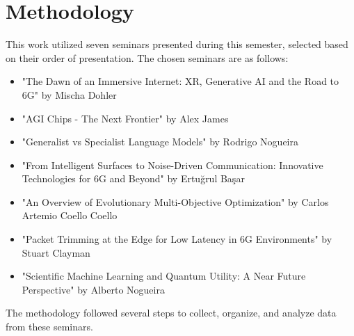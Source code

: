 \section{Methodology}

This work utilized seven seminars presented during this semester, selected based on their order of presentation. The chosen seminars are as follows: 
\begin{itemize}
    \item "The Dawn of an Immersive Internet: XR, Generative AI and the Road to 6G" by Mischa Dohler
    \item "AGI Chips - The Next Frontier" by Alex James
    \item "Generalist vs Specialist Language Models" by Rodrigo Nogueira
    \item "From Intelligent Surfaces to Noise-Driven Communication: Innovative Technologies for 6G and Beyond" by Ertuğrul Başar
    \item "An Overview of Evolutionary Multi-Objective Optimization" by Carlos Artemio Coello Coello
    \item "Packet Trimming at the Edge for Low Latency in 6G Environments" by Stuart Clayman
    \item "Scientific Machine Learning and Quantum Utility: A Near Future Perspective" by Alberto Nogueira
\end{itemize}

The methodology followed several steps to collect, organize, and analyze data from these seminars. 

